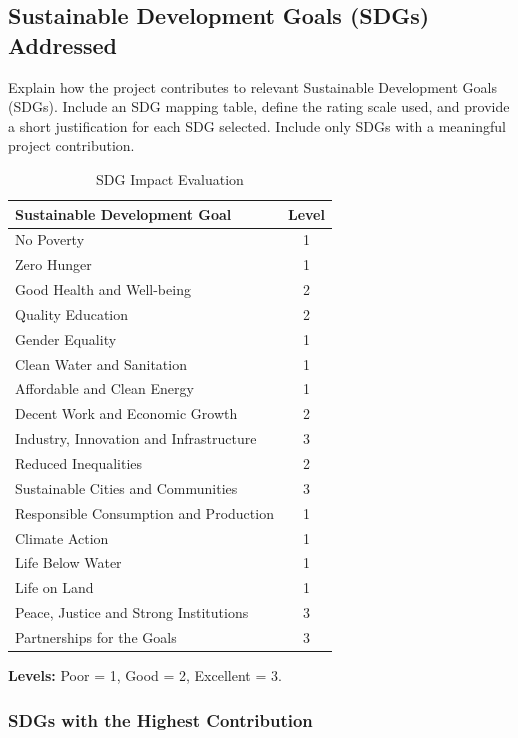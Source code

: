 \begin{appendices}
\chapter{Sustainable Development Goals (SDGs) Addressed}
Explain how the project contributes to relevant Sustainable Development Goals (SDGs). Include an SDG mapping table, define the rating scale used, and provide a short justification for each SDG selected. Include only SDGs with a meaningful project contribution.

\begin{table}[htbp]
	\centering
	\caption{SDG Impact Evaluation}
	\label{tab:sdg-impact}
	\begin{tabular}{|p{10cm}|c|}
		\hline
		\textbf{Sustainable Development Goal} & \textbf{Level} \\
		\hline
		No Poverty & 1 \\ \hline
		Zero Hunger & 1 \\ \hline
		Good Health and Well-being & 2 \\ \hline
		Quality Education & 2 \\ \hline
		Gender Equality & 1 \\ \hline
		Clean Water and Sanitation & 1 \\ \hline
		Affordable and Clean Energy & 1 \\ \hline
		Decent Work and Economic Growth & 2 \\ \hline
		Industry, Innovation and Infrastructure & 3 \\ \hline
		Reduced Inequalities & 2 \\ \hline
		Sustainable Cities and Communities & 3 \\ \hline
		Responsible Consumption and Production & 1 \\ \hline
		Climate Action & 1 \\ \hline
		Life Below Water & 1 \\ \hline
		Life on Land & 1 \\ \hline
		Peace, Justice and Strong Institutions & 3 \\ \hline
		Partnerships for the Goals & 3 \\ \hline
	\end{tabular}
\end{table}

\noindent\textbf{Levels:} Poor = 1, Good = 2, Excellent = 3.

\subsection{SDGs with the Highest Contribution}


\end{appendices}
